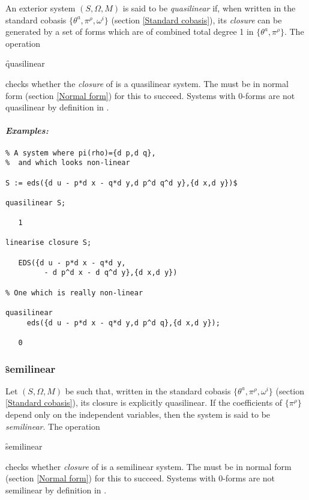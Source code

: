 \hypertarget{operator:QUASILINEAR}{}
An exterior system $(S,\Omega,M)$ is said to be \emph{quasilinear} if, when
written in the standard cobasis $\{\theta^a,\pi^\rho,\omega^i\}$ (section
\ref{Standard cobasis}), its \emph{closure} can be generated by a set of
forms which are of combined total degree 1 in $\{\theta^a,\pi^\rho\}$. The
operation
\begin{syntax}
	\f{quasilinear} 
\end{syntax}
checks whether the \emph{closure} of  is a quasilinear system. The
 must be in normal form (section \ref{Normal form}) for this to
succeed. Systems with 0-forms are not quasilinear by definition in .

\paragraph{\textit{Examples:}}
\begin{verbatim}
% A system where pi(rho)={d p,d q},
%  and which looks non-linear

S := eds({d u - p*d x - q*d y,d p^d q^d y},{d x,d y})$

quasilinear S;

   1

linearise closure S;

   EDS({d u - p*d x - q*d y,
         - d p^d x - d q^d y},{d x,d y})

% One which is really non-linear

quasilinear
     eds({d u - p*d x - q*d y,d p^d q},{d x,d y});

   0
\end{verbatim}

\subsubsection{\f{semilinear}}
\label{semilinear}

\hypertarget{operator:SEMILINEAR}{}
Let $(S,\Omega,M)$ be such that, written in the standard cobasis
$\{\theta^a,\pi^\rho,\omega^i\}$ (section \ref{Standard cobasis}), its
closure is explicitly quasilinear. If the coefficients of $\{\pi^\rho\}$
depend only on the independent variables, then the system is said to be
\emph{semilinear}.  The operation
\begin{syntax}
	\f{semilinear} 
\end{syntax}
checks whether \emph{closure} of  is a semilinear system. The
 must be in normal form (section \ref{Normal form}) for this to
succeed. Systems with 0-forms are not semilinear by definition in .

